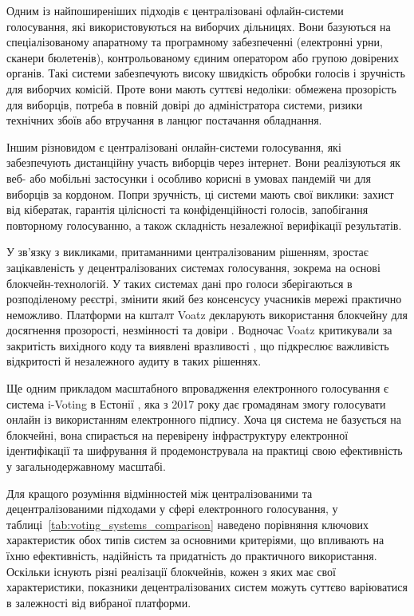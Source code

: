 \documentclass[14pt]{extreport}
\begin{document}
  Одним із найпоширеніших підходів є централізовані офлайн-системи голосування, які використовуються на виборчих дільницях. Вони базуються на спеціалізованому апаратному та програмному забезпеченні (електронні урни, сканери бюлетенів), контрольованому єдиним оператором або групою довірених органів. Такі системи забезпечують високу швидкість обробки голосів і зручність для виборчих комісій. Проте вони мають суттєві недоліки: обмежена прозорість для виборців, потреба в повній довірі до адміністратора системи, ризики технічних збоїв або втручання в ланцюг постачання обладнання.

  Іншим різновидом є централізовані онлайн-системи голосування, які забезпечують дистанційну участь виборців через інтернет. Вони реалізуються як веб- або мобільні застосунки і особливо корисні в умовах пандемій чи для виборців за кордоном. Попри зручність, ці системи мають свої виклики: захист від кібератак, гарантія цілісності та конфіденційності голосів, запобігання повторному голосуванню, а також складність незалежної верифікації результатів.
  
  У зв’язку з викликами, притаманними централізованим рішенням, зростає зацікавленість у децентралізованих системах голосування, зокрема на основі блокчейн-технологій. У таких системах дані про голоси зберігаються в розподіленому реєстрі, змінити який без консенсусу учасників мережі практично неможливо. Платформи на кшталт Voatz декларують використання блокчейну для досягнення прозорості, незмінності та довіри \cite{voatz}. Водночас Voatz критикували за закритість вихідного коду та виявлені вразливості \cite{voatzcriticism}, що підкреслює важливість відкритості й незалежного аудиту в таких рішеннях.

  Ще одним прикладом масштабного впровадження електронного голосування є система i-Voting в Естонії \cite{ivoting}, яка з 2017 року дає громадянам змогу голосувати онлайн із використанням електронного підпису. Хоча ця система не базується на блокчейні, вона спирається на перевірену інфраструктуру електронної ідентифікації та шифрування й продемонструвала на практиці свою ефективність у загальнодержавному масштабі.
  
  Для кращого розуміння відмінностей між централізованими та децентралізованими підходами у сфері електронного голосування, у таблиці~\ref{tab:voting_systems_comparison} наведено порівняння ключових характеристик обох типів систем за основними критеріями, що впливають на їхню ефективність, надійність та придатність до практичного використання. Оскільки існують різні реалізації блокчейнів, кожен з яких має свої характеристики, показники децентралізованих систем можуть суттєво варіюватися в залежності від вибраної платформи.
  
\end{document}
